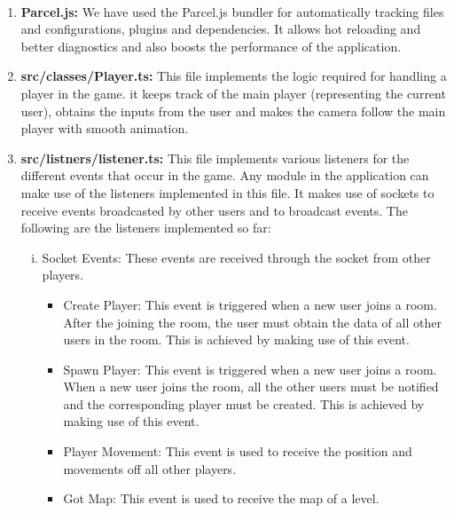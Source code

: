 \documentclass[oneside,12pt]{Classes/VTU}
\begin{document}
	\paragraph{}
	\begin{enumerate}
		\item \textbf{Parcel.js: }We have used the Parcel.js bundler for automatically tracking files and configurations, plugins and dependencies. It allows hot reloading and better diagnostics and also boosts the performance of the application. 
		
		\item \textbf{src/classes/Player.ts: }This file implements the logic required for handling a player in the game. it keeps track of the main player (representing the current user), obtains the inputs from the user and makes the camera follow the main player with smooth animation. 
		
		\item \textbf{src/listners/listener.ts: }This file implements various listeners for the different events that occur in the game. Any module in the application can make use of the listeners implemented in this file. It makes use of sockets to receive events broadcasted by other users and to broadcast events. The following are the listeners implemented so far:
		\begin{enumerate}[i.]
			\item Socket Events: These events are received through the socket from other players. 
			\begin{itemize}
				\item Create Player: This event is triggered when a new user joins a room. After the joining the room, the user must obtain the data of all other users in the room. This is achieved by making use of this event. 
				
				\item Spawn Player: This event is triggered when a new user joins a room. When a new user joins the room, all the other users must be notified and the corresponding player must be created. This is achieved by making use of this event. 
				
				\item Player Movement: This event is used to receive the position and movements off all other players. 
				
				\item Got Map: This event is used to receive the map of a level. 
				

\end{itemize}
\end{enumerate}
\end{enumerate}
\end{document}
